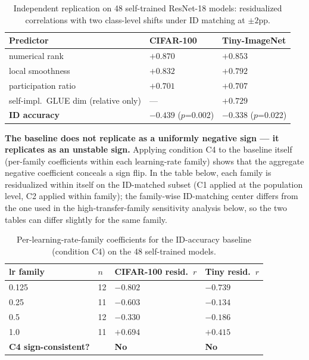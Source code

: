 \documentclass[10pt]{article} %
\begin{document}
\begin{table}[t]
\caption{Independent replication on 48 self-trained ResNet-18 models: residualized correlations with two class-level shifts under ID matching at $\pm2$pp.}
\label{tab:replication}
\centering
\small
\setlength{\tabcolsep}{6pt}
\begin{tabular}{@{}p{4.6cm}p{3.4cm}p{3.4cm}@{}}
\hline
Predictor & CIFAR-100 & Tiny-ImageNet \\
\hline
numerical rank & \textbf{$+0.870$} & \textbf{$+0.853$} \\
\hline
local smoothness & $+0.832$ & $+0.792$ \\
\hline
participation ratio & $+0.701$ & $+0.707$ \\
\hline
self-impl.\ GLUE dim (relative only) & --- & $+0.729$ \\
\hline
\textbf{ID accuracy} & \textbf{$-0.439$} ($p$=0.002) & \textbf{$-0.338$} ($p$=0.022) \\
\hline
\end{tabular}
\end{table}

\textbf{The baseline does not replicate as a uniformly negative sign --- it replicates as an unstable sign.} Applying condition C4 to the baseline itself (per-family coefficients within each learning-rate family) shows that the aggregate negative coefficient conceals a sign flip. In the table below, each family is residualized within itself on the ID-matched subset (C1 applied at the population level, C2 applied within family); the family-wise ID-matching center differs from the one used in the high-transfer-family sensitivity analysis below, so the two tables can differ slightly for the same family.

\begin{table}[t]
\caption{Per-learning-rate-family coefficients for the ID-accuracy baseline (condition C4) on the 48 self-trained models.}
\label{tab:families}
\centering
\small
\setlength{\tabcolsep}{6pt}
\begin{tabular}{@{}p{2.8cm}p{1.2cm}p{3.6cm}p{3.2cm}@{}}
\hline
lr family & $n$ & CIFAR-100 resid.\ $r$ & Tiny resid.\ $r$ \\
\hline
0.125 & 12 & $-0.802$ & $-0.739$ \\
\hline
0.25 & 11 & $-0.603$ & $-0.134$ \\
\hline
0.5 & 12 & $-0.330$ & $-0.186$ \\
\hline
1.0 & 11 & \textbf{$+0.694$} & \textbf{$+0.415$} \\
\hline
\textbf{C4 sign-consistent?} & & \textbf{No} & \textbf{No} \\
\hline
\end{tabular}
\end{table}
\end{document}
